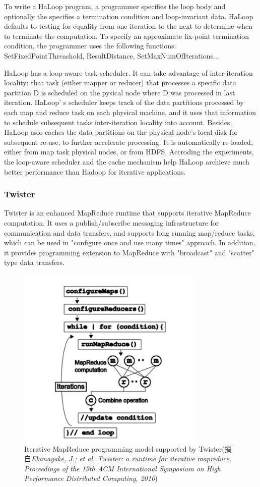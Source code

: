 To write a HaLoop program, a programmer specifies the loop body and optionally the specifies a termination condition and loop-invariant data.  HaLoop defaults to testing for equality from one iteration to the next to determine when to terminate the computation. To specify an approximate fix-point termination condition, the programmer uses the following functions: SetFixedPointThreashold, ResultDistance, SetMaxNumOfIterations...

HaLoop has a loop-aware task scheduler. It can take advantage of inter-iteration locality: that task (either mapper or reducer) that processes a specific data partition D is scheduled on the pysical node where D was processed in last iteration. HaLoop'
s scheduler keeps track of the data partitions processed by each map and reduce task on each physical machine, and it uses that information to schedule subsequent tasks inter-iteration locality into account. Besides, HaLoop aslo caches the data partitions on the physical node's local disk for subsequent re-use, to further accelerate processing. It is automatically re-loaded, either from map task physical nodes, or from HDFS. Accroding the experiments, the loop-aware scheduler and the cache mechanism help HaLoop archieve much better performance than Hadoop for iterative applications.

\subsubsection{Twister}
Twister is an enhanced MapReduce runtime that supports iterative MapReduce computation. It uses a publish/subscribe messaging infrastructure for communication and data transfers, and supports long running map/reduce tasks, which can be used in "configure once and use many times" approach. In addition, it provides programming extension to MapReduce with "broadcast" and "scatter" type data transfers.

\begin{figure}[]
\centering
\includegraphics[width=3.5in]{../figures/twister.pdf}
\caption{Iterative MapReduce programming model supported by Twister(摘自\textit{Ekanayake, J.; et al. Twister: a runtime for iterative mapreduce. Proceedings of the 19th ACM International Symposium on High Performance Distributed Computing, 2010})}
\label{fig:twister}
\end{figure}

